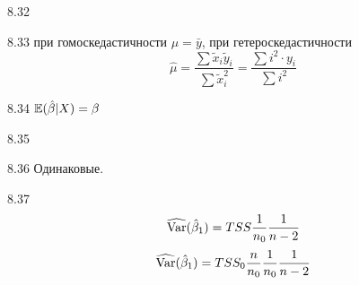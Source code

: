 \begin{solution}{{8.32}}

\end{solution}
\protect \hypertarget {soln:8.33}{}
\begin{solution}{{8.33}}
при гомоскедастичности $\hat{\mu}=\bar{y}$, при гетероскедастичности
\[
\hat{\mu}=\frac{\sum \tilde{x}_i \tilde{y}_i}{\sum \tilde{x}_i^2}=\frac{\sum i^2\cdot y_i}{\sum i^2}
\]
\end{solution}
\protect \hypertarget {soln:8.34}{}
\begin{solution}{{8.34}}
$\mathbb{E}(\hat{\beta}|X)=\beta$
\end{solution}
\protect \hypertarget {soln:8.35}{}
\begin{solution}{{8.35}}

\end{solution}
\protect \hypertarget {soln:8.36}{}
\begin{solution}{{8.36}}
Одинаковые.
\end{solution}
\protect \hypertarget {soln:8.37}{}
\begin{solution}{{8.37}}
\[
\widehat{\operatorname{Var}}(\hat{\beta}_1) = TSS \frac{1}{n_0}\frac{1}{n-2}
\]
\[
\widehat{\operatorname{Var}}(\hat{\beta}_1) = TSS_0\frac{n}{n_0} \frac{1}{n_0}\frac{1}{n-2}
\]
\end{solution}
